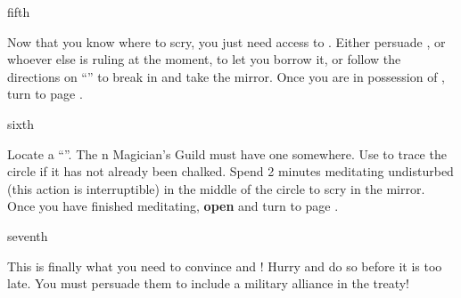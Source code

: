 \documentclass[greennotebook]{NeptuneBall}
\begin{document}
\begin{page}{fifth}

Now that you know where to scry, you just need access to \iScryingMirror{}. Either persuade \cKing{\King} \cKing{}, or whoever else is ruling \pAtlantis{} at the moment, to let you borrow it, or follow the directions on ``\sArtifactThree{}'' to break in and take the mirror. Once you are in possession of \iScryingMirror{}, turn to page .

\end{page}

\begin{page}{sixth}

Locate a ``\sRunicCircle{}''. The \pAtlantis{}n Magician's Guild must have one somewhere. Use \iChalk{} to trace the circle if it has not already been chalked. Spend 2 minutes meditating undisturbed (this action is interruptible) in the middle of the circle to scry in the mirror. Once you have finished meditating, {\bf open \iScryingMirror{}} and turn to page .

\end{page}

\begin{page}{seventh}

This is finally what you need to convince \cKing{} and \cPrince{}! Hurry and do so before it is too late. You must persuade them to include a military alliance in the treaty!

\end{page}


\endnotebook
\end{document}

